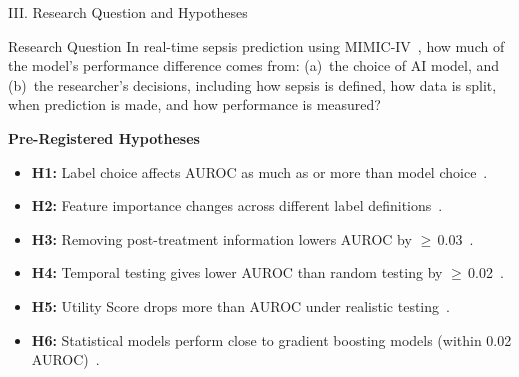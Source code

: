 \begin{frame}{III. Research Question and Hypotheses}
\begin{block}{Research Question}
  In real-time sepsis prediction using MIMIC-IV~\cite{johnson2023mimiciv},
  how much of the model's performance difference comes from:
  (a)~the choice of AI model, and (b)~the researcher's decisions, including
  how sepsis is defined, how data is split, when prediction is made, and how
  performance is measured?
\end{block}

\vspace{6pt}
\textbf{Pre-Registered Hypotheses}
\begin{itemize}\itemsep1pt\small
  \item \textbf{H1:} Label choice affects AUROC as much as or more than model
        choice~\cite{cohen2024subtle}.
  \item \textbf{H2:} Feature importance changes across different label
        definitions~\cite{lauritsen2021framing}.
  \item \textbf{H3:} Removing post-treatment information lowers AUROC by
        $\geq$\,0.03~\cite{kamran2024evaluation}.
  \item \textbf{H4:} Temporal testing gives lower AUROC than random testing
        by $\geq$\,0.02~\cite{guo2022temporal}.
  \item \textbf{H5:} Utility Score drops more than AUROC under realistic
        testing~\cite{wang2025srpm}.
  \item \textbf{H6:} Statistical models perform close to gradient boosting
        models (within 0.02 AUROC)~\cite{wang2022equity}.
\end{itemize}
\end{frame}
